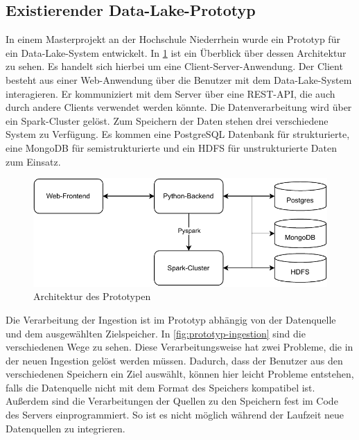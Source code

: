 \subsection{Existierender Data-Lake-Prototyp}
In einem Masterprojekt an der Hochschule Niederrhein \parencite{prototyp} wurde ein Prototyp für ein Data-Lake-System entwickelt.
In \cref{fig:prototyp-architektur} ist ein Überblick über dessen Architektur zu sehen.
Es handelt sich hierbei um eine Client-Server-Anwendung.
Der Client besteht aus einer Web-Anwendung über die Benutzer mit dem Data-Lake-System interagieren.
Er kommuniziert mit dem Server über eine REST-API, die auch durch andere Clients verwendet werden könnte.
Die Datenverarbeitung wird über ein Spark-Cluster gelöst.
Zum Speichern der Daten stehen drei verschiedene System zu Verfügung.
Es kommen eine PostgreSQL Datenbank für strukturierte, eine MongoDB für semistrukturierte und ein HDFS für unstrukturierte Daten zum Einsatz.

\begin{figure}
    \centering
    \includegraphics{Grafiken/Prototyp-Architektur.pdf}
    \caption[Architektur des Prototypen]{Architektur des Prototypen}
    \label{fig:prototyp-architektur}
\end{figure}

Die Verarbeitung der Ingestion ist im Prototyp abhängig von der Datenquelle und dem ausgewählten Zielspeicher.
In \cref{fig:prototyp-ingestion}  sind die verschiedenen Wege zu sehen.
Diese Verarbeitungsweise hat zwei Probleme, die in der neuen Ingestion gelöst werden müssen.
Dadurch, dass der Benutzer aus den verschiedenen Speichern ein Ziel auswählt, können hier leicht Probleme entstehen, falls die Datenquelle nicht mit dem Format des Speichers kompatibel ist.
Außerdem sind die Verarbeitungen der Quellen zu den Speichern fest im Code des Servers einprogrammiert.
So ist es nicht möglich während der Laufzeit neue Datenquellen zu integrieren.


